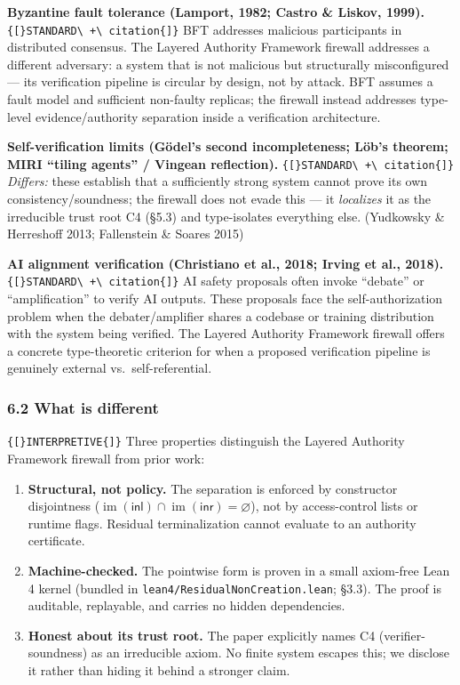 \documentclass[
  10pt,
]{article}
\providecommand{\tightlist}{%
  \setlength{\itemsep}{0pt}\setlength{\parskip}{0pt}}
\providecommand{\tightlist}{%
  \setlength{\itemsep}{0pt}\setlength{\parskip}{0pt}}
\DeclareRobustCommand{\texttt}[1]{{\paperSymbolFont\nolinkurl{#1}}}
\begin{document}
\textbf{Byzantine fault tolerance (Lamport, 1982; Castro \& Liskov, 1999).} \texttt{{[}STANDARD\ +\ citation{]}} BFT addresses malicious participants in distributed consensus. The Layered Authority Framework firewall addresses a different adversary: a system that is not malicious but structurally misconfigured --- its verification pipeline is circular by design, not by attack. BFT assumes a fault model and sufficient non-faulty replicas; the firewall instead addresses type-level evidence/authority separation inside a verification architecture.

\textbf{Self-verification limits (Gödel's second incompleteness; Löb's theorem; MIRI ``tiling agents'' / Vingean reflection).} \texttt{{[}STANDARD\ +\ citation{]}} \emph{Differs:} these establish that a sufficiently strong system cannot prove its own consistency/soundness; the firewall does not evade this --- it \emph{localizes} it as the irreducible trust root C4 (§5.3) and type-isolates everything else. (Yudkowsky \& Herreshoff 2013; Fallenstein \& Soares 2015)

\textbf{AI alignment verification (Christiano et al., 2018; Irving et al., 2018).} \texttt{{[}STANDARD\ +\ citation{]}} AI safety proposals often invoke ``debate'' or ``amplification'' to verify AI outputs. These proposals face the self-authorization problem when the debater/amplifier shares a codebase or training distribution with the system being verified. The Layered Authority Framework firewall offers a concrete type-theoretic criterion for when a proposed verification pipeline is genuinely external vs.~self-referential.

\subsubsection{6.2 What is different}\label{what-is-different}

\texttt{{[}INTERPRETIVE{]}} Three properties distinguish the Layered Authority Framework firewall from prior work:

\begin{enumerate}
\def\labelenumi{\arabic{enumi}.}
\tightlist
\item
  \textbf{Structural, not policy.} The separation is enforced by constructor disjointness (\protect\hypertarget{math-E0046-0130}{}{\(\operatorname{im}(\mathsf{inl}) \cap \operatorname{im}(\mathsf{inr}) = \varnothing\)}), not by access-control lists or runtime flags. Residual terminalization cannot evaluate to an authority certificate.
\item
  \textbf{Machine-checked.} The pointwise form is proven in a small axiom-free Lean 4 kernel (bundled in \texttt{lean4/ResidualNonCreation.lean}; §3.3). The proof is auditable, replayable, and carries no hidden dependencies.
\item
  \textbf{Honest about its trust root.} The paper explicitly names C4 (verifier-soundness) as an irreducible axiom. No finite system escapes this; we disclose it rather than hiding it behind a stronger claim.
\end{enumerate}
\end{document}

